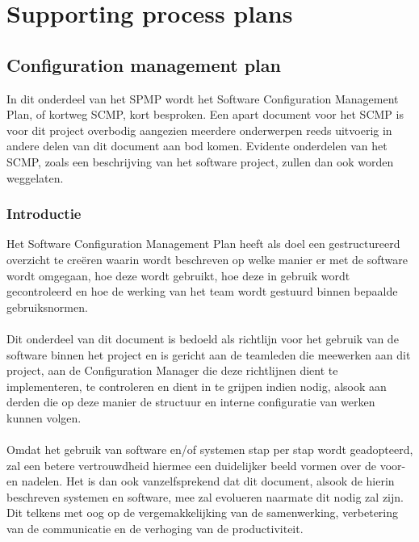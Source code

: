 \chapter{Supporting process plans}
\section{Configuration management plan} \label{SoftwareConfigurationManagementPlan}
In dit onderdeel van het SPMP wordt het Software Configuration Management Plan, of kortweg SCMP, kort besproken. Een apart document voor het SCMP is voor dit project overbodig aangezien meerdere onderwerpen reeds uitvoerig in andere delen van dit document aan bod komen. Evidente onderdelen van het SCMP, zoals een beschrijving van het software project, zullen dan ook worden weggelaten.

\subsection{Introductie}
Het Software Configuration Management Plan heeft als doel een gestructureerd overzicht te cre\"{e}ren waarin wordt beschreven op welke manier er met de software wordt omgegaan, hoe deze wordt gebruikt, hoe deze in gebruik wordt gecontroleerd en hoe de werking van het team wordt gestuurd binnen bepaalde gebruiksnormen.
\\
\\
Dit onderdeel van dit document is bedoeld als richtlijn voor het gebruik van de software binnen het project en is gericht aan de teamleden die meewerken aan dit project, aan de Configuration Manager die deze richtlijnen dient te implementeren, te controleren en dient in te grijpen indien nodig, alsook aan derden die op deze manier de structuur en interne configuratie van werken kunnen volgen.
\\
\\
Omdat het gebruik van software en/of systemen stap per stap wordt geadopteerd, zal een betere vertrouwdheid hiermee een duidelijker beeld vormen over de voor- en nadelen. Het is dan ook vanzelfsprekend dat dit document, alsook de hierin beschreven systemen en software, mee zal evolueren naarmate dit nodig zal zijn. Dit telkens met oog op de vergemakkelijking van de samenwerking, verbetering van de communicatie en de verhoging van de productiviteit.

